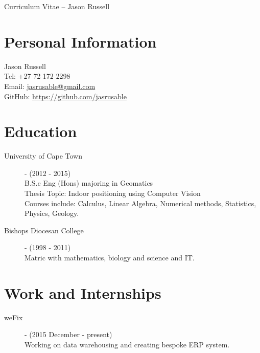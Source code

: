 \documentclass[margin,line,a4paper]{resume}
\begin{document}
    {\sc \Large Curriculum Vitae -- Jason Russell}
    \begin{resume}
        \vspace{0.5cm}

        \section{\mysidestyle Personal Information}
            Jason Russell\\
            Tel: +27 72 172 2298\\
            Email: \href{mailto:jasrusable@gmail.com}{jasrusable@gmail.com}\\
            GitHub: \href{https://github.com/jasrusable}{https://github.com/jasrusable}\\

        \section{\mysidestyle Education}
            \begin{description}
                \item[University of Cape Town] - (2012 - 2015) \\
                    B.S.c Eng (Hons) majoring in Geomatics \\
                    Thesis Topic: Indoor positioning using Computer Vision \\
                    Courses include: Calculus, Linear Algebra, Numerical methods, Statistics, Physics, Geology.
                   
                \item[Bishops Diocesan College] - (1998 - 2011) \\
                Matric with mathematics, biology and science and IT.
            \end{description}


        \section{\mysidestyle Work and Internships}
            \begin{description}
                \item [weFix] - (2015 December - present) \\
                    Working on data warehousing and creating bespoke ERP system.
            \end{description}
            

\end{resume}
\end{document}
